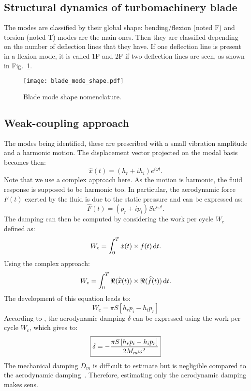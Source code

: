 \subsection{Structural dynamics of turbomachinery blade}
\label{sub:structural_dynamics_of_turbomachinery_blade}

The modes are classified by their global shape: 
bending/flexion (noted F) and torsion (noted T) 
modes are the main ones. Then they are classified
depending on the number of deflection lines that they
have. If one deflection line is present in a flexion 
mode, it is called 1F and 2F if two deflection lines are
seen, as shown in Fig.~\ref{fig:blade_mode_shape}.
\begin{figure}[htp]
  \centering
  \texttt{[image: blade\_mode\_shape.pdf]}
  \caption{Blade mode shape nomenclature.}
  \label{fig:blade_mode_shape}
\end{figure}

\subsection{Weak-coupling approach}
\label{sub:weak_coupling_approach}

The modes being identified, these are prescribed
with a small vibration amplitude and a harmonic motion.
The displacement vector projected on the modal basis becomes then:
\begin{equation}
   \widehat{x}(t) = (h_r + i h_i) e^{i \omega t}.
   \label{eq:harm_vib_displ_vector}
\end{equation}
Note that we use a complex approach here.
As the motion is harmonic, the fluid response is
supposed to be harmonic too.
In particular, the aerodynamic force $F (t)$ exerted by the fluid is due to the
static pressure and can be expressed as:
\begin{equation}
    \widehat{F}(t) = (p_r + i p_i) S e^{i \omega t}.
\end{equation}
The damping can then be computed by considering the 
work per cycle $W_c$ defined as:
\begin{equation}
    W_c = \int_0^T \dot{x} (t) \times f(t) \mathop{}\!\mathrm{d} t.
\end{equation}
Using the complex approach:
\begin{equation}
    W_c = \int_0^T \Re (\dot{\widehat{x}} (t)) \times \Re (\widehat{f}(t)) \mathop{}\!\mathrm{d} t.
\end{equation}
The development of this equation leads to:
\begin{equation}
    W_c = \pi S \left[h_r p_i - h_i p_r \right]
\end{equation}
According to \citet{Carta1967}, the aerodynamic 
damping $\delta$ can be expressed using the
work per cycle $W_c$, which gives to:
\begin{equation}
    \fbox{$
    \delta = - \displaystyle \frac{\pi S \left[h_r p_i - h_i p_r \right]}{2 M_m \omega^2}
    $}
\end{equation}
The mechanical damping $D_m$ is difficult to estimate
but is negligible compared to the aerodynamic damping~\cite{Mikolajczak1975}.
Therefore, estimating only the aerodynamic damping makes sens.

